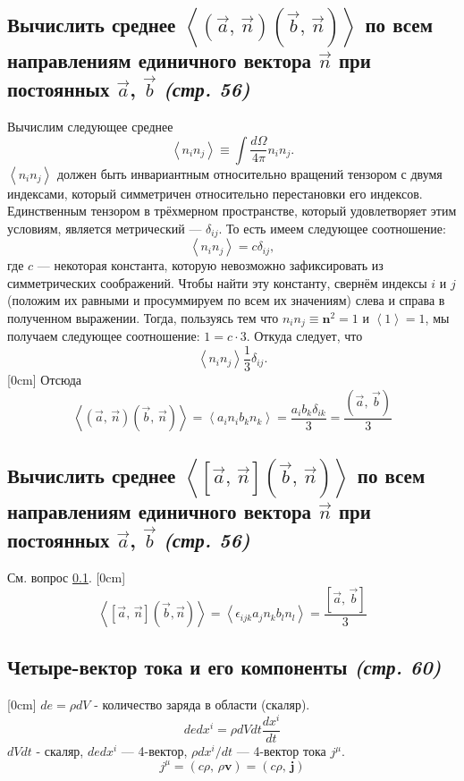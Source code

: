 \documentclass[a4paper,12pt]{article}
\begin{document}
\subsection{Вычислить среднее $\left<\left(\vec{a},\,\vec{n}\right)
\left( \vec{b},\,\vec{n} \right) \right>$ по всем направлениям единичного
вектора $\vec{n}$ при постоянных  $\vec{a}$, $\vec{b}$ \emph{(стр. 56)}}
\label{subsec:18}
Вычислим следующее среднее
\[
\left<n_i n_j \right>\equiv \int \frac{d\Omega}{4\pi}n_i n_j
.\]
$\left<n_i n_j \right>$ должен быть инвариантным относительно вращений тензором
с двумя индексами, который симметричен относительно перестановки его индексов.
Единственным тензором в трёхмерном пространстве, который удовлетворяет этим
условиям, является метрический --- $\delta_{ij}$. То есть имеем следующее
соотношение:
\[
\left<n_i n_j \right> = c \delta_{ij}
,\] 
где $c$ --- некоторая константа, которую невозможно зафиксировать из
симметрических соображений. Чтобы найти эту константу, свернём индексы $i$ и
$j$ (положим их равными и просуммируем по всем их значениям) слева и справа в
полученном выражении. Тогда, пользуясь тем что  $n_i n_j \equiv \mathbf{n}^2=1$
и $\left<1 \right> = 1$, мы получаем следующее соотношение: $1=c\cdot 3$.
Откуда следует, что
 \[
\left<n_i n_j \right> \frac{1}{3}\delta_{ij}
.\] 
[0cm]
Отсюда 
\begin{equation*}
	\left<\left(\vec{a},\,\vec{n}\right)
\left(\vec{b}
,\,\vec{n}\right)\right>=\left< a_i n_i b_k n_k\right>=\frac{a_i b_k \delta_{ik}}{3}=
\frac{\left(\vec{a},\,\vec{b}\right)}{3}
\end{equation*}
\subsection{Вычислить среднее $\left<\left[\vec{a},\,\vec{n}\right]
\left( \vec{b},\,\vec{n} \right) \right>$ по всем направлениям единичного
вектора $\vec{n}$ при постоянных  $\vec{a}$, $\vec{b}$ \emph{(стр. 56)}}
См. вопрос \ref{subsec:18}.
[0cm]
\[
	\left<[\vec{a},\,\vec{n}]\left(\vec{b},\vec{n}\right)\right>=\left<
	\epsilon_{ijk}
	a_j n_k b_l n_l\right>=\frac{\left[\vec{a},\,\vec{b}\right]}{3}
\]
\subsection{Четыре-вектор тока и его компоненты \emph{(стр. 60)}}
[0cm]
$de=\rho dV$ - количество заряда в области (скаляр).
\[
de dx^i=\rho dV dt \frac{dx^i}{dt}
\]
$dV dt$ - скаляр, $de dx^i$ --- 4-вектор, $\rho dx^i/dt$ --- 4-вектор тока $j^\mu$.
\[
j^\mu=\left(c\rho,\,\rho\mathbf{v}\right)=\left(c\rho,\,\mathbf{j}\right)
\]
\end{document}
